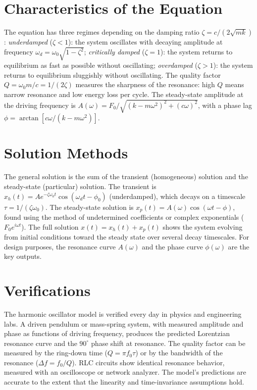 \section*{Characteristics of the Equation}

The equation has three regimes depending on the damping ratio $\zeta = c/(2\sqrt{mk})$: \textit{underdamped} ($\zeta < 1$): the system oscillates with decaying amplitude at frequency $\omega_d = \omega_0\sqrt{1-\zeta^2}$; \textit{critically damped} ($\zeta = 1$): the system returns to equilibrium as fast as possible without oscillating; \textit{overdamped} ($\zeta > 1$): the system returns to equilibrium sluggishly without oscillating. The quality factor $Q = \omega_0 m/c = 1/(2\zeta)$ measures the sharpness of the resonance: high $Q$ means narrow resonance and low energy loss per cycle. The steady-state amplitude at the driving frequency is $A(\omega) = F_0/\sqrt{(k - m\omega^2)^2 + (c\omega)^2}$, with a phase lag $\phi = \arctan[c\omega/(k - m\omega^2)]$.
\section*{Solution Methods}

The general solution is the sum of the transient (homogeneous) solution and the steady-state (particular) solution. The transient is $x_h(t) = Ae^{-\zeta\omega_0 t}\cos(\omega_d t - \phi_0)$ (underdamped), which decays on a timescale $\tau = 1/(\zeta\omega_0)$. The steady-state solution is $x_p(t) = A(\omega)\cos(\omega t - \phi)$, found using the method of undetermined coefficients or complex exponentials ($F_0 e^{i\omega t}$). The full solution $x(t) = x_h(t) + x_p(t)$ shows the system evolving from initial conditions toward the steady state over several decay timescales. For design purposes, the resonance curve $A(\omega)$ and the phase curve $\phi(\omega)$ are the key outputs.
\section*{Verifications}

The harmonic oscillator model is verified every day in physics and engineering labs. A driven pendulum or mass-spring system, with measured amplitude and phase as functions of driving frequency, produces the predicted Lorentzian resonance curve and the $90^\circ$ phase shift at resonance. The quality factor can be measured by the ring-down time ($Q = \pi f_0\tau$) or by the bandwidth of the resonance ($\Delta f = f_0/Q$). RLC circuits show identical resonance behavior, measured with an oscilloscope or network analyzer. The model's predictions are accurate to the extent that the linearity and time-invariance assumptions hold.
